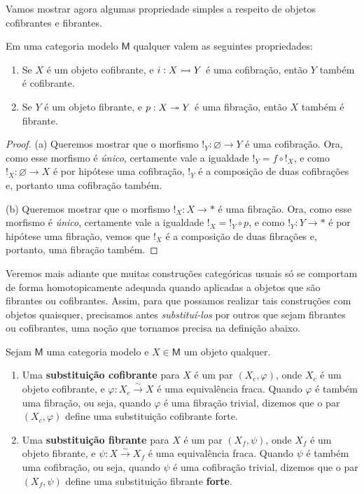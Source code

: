 Vamos mostrar agora algumas propriedade simples a respeito de objetos cofibrantes e fibrantes.

\begin{lema}
  Em uma categoria modelo $\mathsf{M}$ qualquer valem as seguintes propriedades:
  \begin{enumerate}
  \item[(a)] Se $X$ é um objeto cofibrante, e $i: X \rightarrowtail Y$ é uma cofibração, então $Y$ também é cofibrante.
    
  \item[(b)] Se $Y$ é um objeto fibrante, e $p: X \twoheadrightarrow Y$ é uma fibração, então $X$ também é fibrante.
  \end{enumerate}
\end{lema}

\begin{proof}
  (a) Queremos mostrar que o morfismo $!_{Y}: \varnothing \to Y$ é uma cofibração.
  Ora, como esse morfismo é \emph{único}, certamente vale a igualdade $!_{Y} = f \circ !_{X}$, e como $!_{X}: \varnothing \to X$ é por hipótese uma cofibração, $!_{Y}$ é a composição de duas cofibrações e, portanto uma cofibração também.

  \smallskip
  (b) Queremos mostrar que o morfismo $!_{X}: X \to *$ é uma fibração.
  Ora, como esse morfismo é \emph{único}, certamente vale a igualdade $!_{X} = !_{Y} \circ p$, e como $!_{Y}: Y \to *$ é por hipótese uma fibração, vemos que $!_{X}$ é a composição de duas fibrações e, portanto, uma fibração também.
\end{proof}

Veremos mais adiante que muitas construções categóricas usuais só se comportam de forma homotopicamente adequada quando aplicadas a objetos que são fibrantes ou cofibrantes.
Assim, para que possamos realizar tais construções com objetos quaisquer, precisamos antes \emph{substituí-los} por outros que sejam fibrantes ou cofibrantes, uma noção que tornamos precisa na definição abaixo.

\begin{defin}
  Sejam $\mathsf{M}$ uma categoria modelo e $X \in \mathsf{M}$ um objeto qualquer.
  \begin{enumerate}
  \item Uma \textbf{substituição cofibrante} para $X$ é um par $(X_{c},\varphi)$, onde $X_{c}$ é um objeto cofibrante, e $\varphi: X_{c} \overset{\sim}{\to} X$ é uma equivalência fraca.
    Quando $\varphi$ é também uma fibração, ou seja, quando $\varphi$ é uma fibração trivial, dizemos que o par $(X_{c},\varphi)$ define uma substituição cofibrante forte.
    
  \item Uma \textbf{substituição fibrante} para $X$ é um par $(X_{f},\psi)$, onde $X_{f}$ é um objeto fibrante, e $\psi: X \overset{\sim}{\to} X_{f}$ é uma equivalência fraca.
    Quando $\psi$ é também uma cofibração, ou seja, quando $\psi$ é uma cofibração trivial, dizemos que o par $(X_{f},\psi)$ define uma substituição fibrante \textbf{forte}.
  \end{enumerate}
\end{defin}


